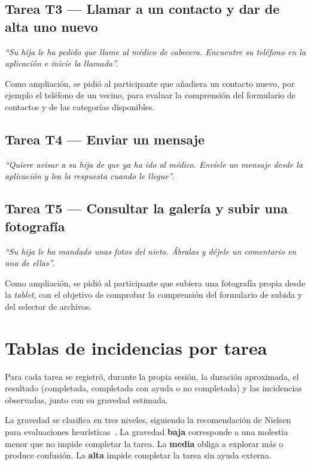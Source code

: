 \subsection{Tarea T3 — Llamar a un contacto y dar de alta uno
nuevo}

\emph{``Su hija le ha pedido que llame al médico de cabecera.
Encuentre su teléfono en la aplicación e inicie la llamada''.}

Como ampliación, se pidió al participante que añadiera un contacto nuevo,
por ejemplo el teléfono de un vecino, para evaluar la comprensión del
formulario de contactos y de las categorías disponibles.

\subsection{Tarea T4 — Enviar un mensaje}

\emph{``Quiere avisar a su hija de que ya ha ido al médico.
Envíele un mensaje desde la aplicación y lea la respuesta cuando
le llegue''.}

\subsection{Tarea T5 — Consultar la galería y subir una
fotografía}

\emph{``Su hija le ha mandado unas fotos del nieto. Ábralas y
déjele un comentario en una de ellas''.}

Como ampliación, se pidió al participante que subiera una fotografía
propia desde la \emph{tablet}, con el objetivo de comprobar la
comprensión del formulario de subida y del selector de archivos.


\section{Tablas de incidencias por
tarea\label{SEC:APP_INCIDENCIAS}}

Para cada tarea se registró, durante la propia sesión, la duración
aproximada, el resultado (completada, completada con ayuda o no completada)
y las incidencias observadas, junto con su gravedad estimada.

La gravedad se clasifica en tres niveles, siguiendo la recomendación de
Nielsen para evaluaciones heurísticas~\cite{nielsen_severidad}. La gravedad
\textbf{baja} corresponde a una molestia menor que no impide completar la
tarea. La \textbf{media} obliga a explorar más o produce confusión. La
\textbf{alta} impide completar la tarea sin ayuda externa.


